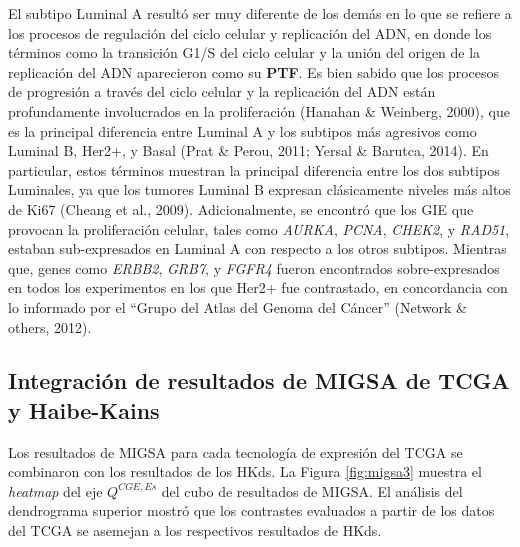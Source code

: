\documentclass[12pt,twoside]{reedthesis}
\begin{document}
\par

El subtipo Luminal A resultó ser muy diferente de los demás en lo que se refiere a los procesos de regulación del ciclo celular y replicación del ADN, en donde los términos como la transición G1/S del ciclo celular y la unión del origen de la replicación del ADN aparecieron como su \textbf{PTF}. Es bien sabido que los procesos de progresión a través del ciclo celular y la replicación del ADN están profundamente involucrados en la proliferación (Hanahan \& Weinberg, 2000), que es la principal diferencia entre Luminal A y los subtipos más agresivos como Luminal B, Her2+, y Basal (Prat \& Perou, 2011; Yersal \& Barutca, 2014). En particular, estos términos muestran la principal diferencia entre los dos subtipos Luminales, ya que los tumores Luminal B expresan clásicamente niveles más altos de Ki67 (Cheang et al., 2009). Adicionalmente, se encontró que los GIE que provocan la proliferación celular, tales como \emph{AURKA}, \emph{PCNA}, \emph{CHEK2}, y \emph{RAD51}, estaban sub-expresados en Luminal A con respecto a los otros subtipos. Mientras que, genes como \emph{ERBB2}, \emph{GRB7}, y \emph{FGFR4} fueron encontrados sobre-expresados en todos los experimentos en los que Her2+ fue contrastado, en concordancia con lo informado por el ``Grupo del Atlas del Genoma del Cáncer'' (Network \& others, 2012).

\hypertarget{integracion-de-resultados-de-migsa-de-tcga-y-haibe-kains}{%
\subsection{Integración de resultados de MIGSA de TCGA y Haibe-Kains}\label{integracion-de-resultados-de-migsa-de-tcga-y-haibe-kains}}

\par

Los resultados de MIGSA para cada tecnología de expresión del TCGA se combinaron con los resultados de los HKds. La Figura \ref{fig:migsa3} muestra el \emph{heatmap} del eje \(Q^{CGE,Es}\) del cubo de resultados de MIGSA. El análisis del dendrograma superior mostró que los contrastes evaluados a partir de los datos del TCGA se asemejan a los respectivos resultados de HKds.

\par
\end{document}
